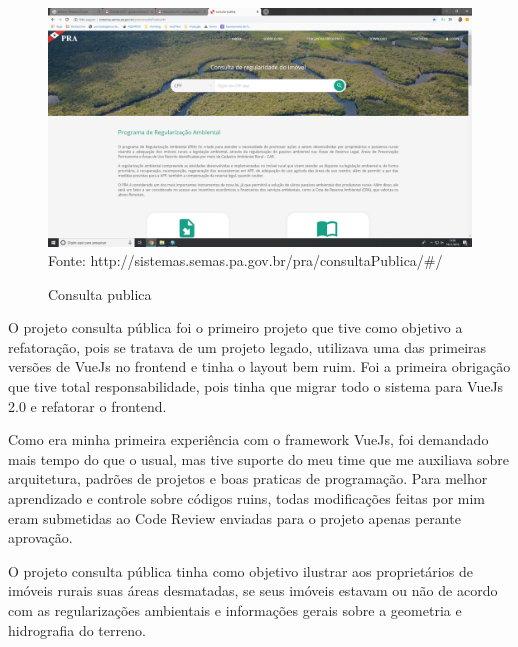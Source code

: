 \begin{figure}[H]
\centering
\caption{Consulta publica} %
\includegraphics[scale=0.22]{consulta-publica}\\  %
{\small Fonte: http://sistemas.semas.pa.gov.br/pra/consultaPublica/#/} %
\label{fig:exemplo} %
\end{figure}

O projeto consulta pública foi o primeiro projeto que tive como objetivo a refatoração, pois se tratava de um projeto legado, utilizava uma das primeiras versões de VueJs no frontend e tinha o layout bem ruim.
Foi a primeira obrigação que tive total responsabilidade, pois tinha que migrar todo o sistema para VueJs 2.0 e refatorar o frontend.

Como era minha primeira experiência com o framework VueJs, foi demandado mais tempo do que o usual, mas tive suporte do meu time que me auxiliava sobre arquitetura, padrões de projetos e boas praticas de programação.
Para melhor aprendizado e controle sobre códigos ruins, todas modificações feitas por mim eram submetidas ao Code Review enviadas para o projeto apenas perante aprovação. 

O projeto consulta pública tinha como objetivo ilustrar aos proprietários de imóveis rurais suas áreas desmatadas, se seus imóveis estavam ou não de acordo com as regularizações ambientais e informações gerais sobre a geometria e hidrografia do terreno.


